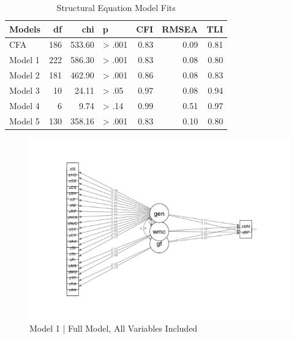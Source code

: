 \documentclass[12pt,]{book}
\begin{document}
\begin{table}[t]

\caption{\label{tab:ModelFits}Structural Equation Model Fits}
\centering
\begin{tabular}{lrrlrrr}
\toprule
Models & df & chi & p & CFI & RMSEA & TLI\\
\midrule
CFA & 186 & 533.60 & > .001 & 0.83 & 0.09 & 0.81\\
Model 1 & 222 & 586.30 & > .001 & 0.83 & 0.08 & 0.80\\
Model 2 & 181 & 462.90 & > .001 & 0.86 & 0.08 & 0.83\\
Model 3 & 10 & 24.11 & > .05 & 0.97 & 0.08 & 0.94\\
Model 4 & 6 & 9.74 & > .14 & 0.99 & 0.51 & 0.97\\
\addlinespace
Model 5 & 130 & 358.16 & > .001 & 0.83 & 0.10 & 0.80\\
\bottomrule
\end{tabular}
\end{table}

\begin{figure}

{\centering \includegraphics[width=1\linewidth]{img/sem1} 

}

\caption{Model 1 | Full Model, All Variables Included}\label{fig:model1}
\end{figure}
\end{document}
